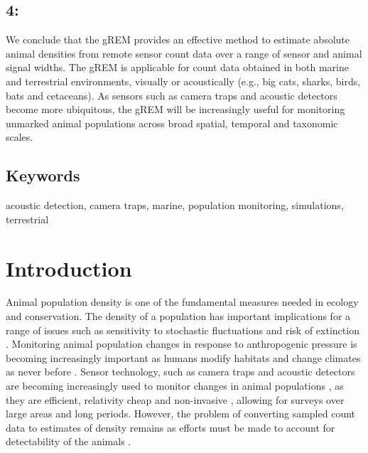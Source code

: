 \documentclass[a4paper,10pt,reqno,oneside]{amsart}
\begin{document}
\subsection*{4:} We conclude that the gREM provides an effective method to estimate absolute animal densities from remote sensor count data over a range of sensor and animal signal widths. The gREM is applicable for count data obtained in both marine and terrestrial environments, visually or acoustically (e.g., big cats, sharks, birds, bats and cetaceans). As sensors such as camera traps and acoustic detectors become more ubiquitous, the gREM will be increasingly useful for monitoring unmarked animal populations across broad spatial, temporal and taxonomic scales. 

\subsection*{Keywords} %
acoustic detection, camera traps, marine, population monitoring, simulations, terrestrial 

\section*{Introduction}

Animal population density is one of the fundamental measures needed in ecology and conservation. The density of a population has important implications for a range of issues such as sensitivity to stochastic fluctuations \citep{richter1972extinction, wright1983stochastic} and risk of extinction \citep{purvis2000predicting}. Monitoring animal population changes in response to anthropogenic pressure is becoming increasingly important as humans modify habitats and change climates as never before \citep{everatt2014trophic}. %
Sensor technology, such as camera traps \citep{rowcliffe2008surveys, karanth1995estimating} and acoustic detectors \citep{ofarrel1999comparison, clark1995application, acevedo2006using} are becoming increasingly used to monitor changes in animal populations \citep{rowcliffe2008surveys, kessel2014review}, as they are efficient, relativity cheap and non-invasive \citep{cutler1999using}, allowing for surveys over large areas and long periods. However, the problem of converting sampled count data to estimates of density remains as efforts must be made to account for detectability of the animals \citep{anderson2001need}.
\end{document}
